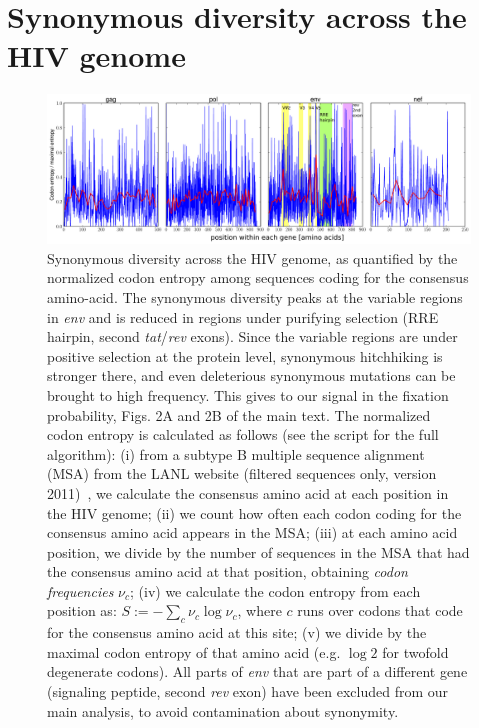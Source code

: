 \documentclass[rmp]{revtex4}
\begin{document}
\section{Synonymous diversity across the HIV genome}
\begin{figure}[h]
\begin{center}
\includegraphics[width=\linewidth]{conservation_codons_genome}
\caption{Synonymous diversity across the HIV genome, as quantified by the
normalized codon entropy among sequences coding for the
consensus amino-acid.
The synonymous diversity peaks at the variable regions in {\it env} and is reduced in regions under purifying selection (RRE
hairpin, second {\it tat}/{\it rev} exons). Since the variable regions are under
positive selection at the protein level, synonymous hitchhiking is stronger
there, and even deleterious synonymous mutations can be brought to high
frequency. This gives to our signal in the fixation probability, Figs. 2A and
2B of the main text.
The normalized codon entropy is calculated as follows (see the script
for the full algorithm): (i) from a subtype B multiple sequence alignment
(MSA) from the LANL website (filtered sequences only, version 2011)~\cite{LANL2012},
we calculate the consensus amino acid at each position in the HIV genome; (ii) we count
how often each codon coding for the consensus amino acid appears in the MSA;
(iii) at each amino acid position, we divide by the number of sequences in the
MSA that had the consensus amino acid at that position, obtaining {\it codon
frequencies} $\nu_c$; (iv) we calculate the codon entropy from each position as:
$S := - \sum_{c} \nu_c \log \nu_c$, where $c$ runs over codons that code for
the consensus amino acid at this site; (v) we divide by the maximal codon
entropy of that amino acid (e.g. $\log 2$ for twofold degenerate codons).
All parts of {\it env} that are part of a different gene (signaling peptide,
second {\it rev} exon) have been excluded from our main analysis, to avoid
contamination about synonymity.}
\label{fig:syndiv_genome}
\end{center}
\end{figure}
\end{document}
